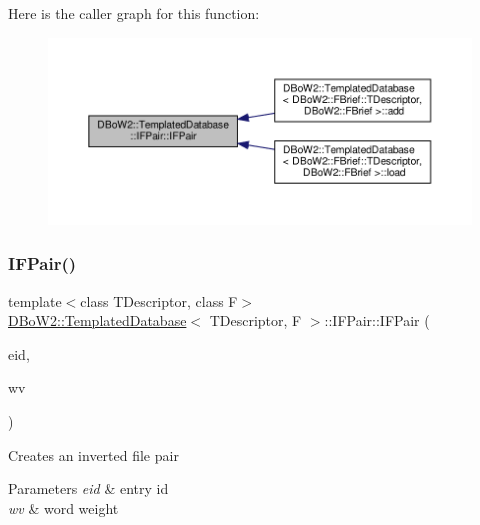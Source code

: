 Here is the caller graph for this function\+:\nopagebreak
\begin{figure}[H]
\begin{center}
\leavevmode
\includegraphics[width=350pt]{structDBoW2_1_1TemplatedDatabase_1_1IFPair_af01918e869de76b592637b0fb4c55401_icgraph}
\end{center}
\end{figure}
\mbox{\label{structDBoW2_1_1TemplatedDatabase_1_1IFPair_a4d449ba7e48cab711302bd5752d65b1e}} 
\subsubsection{\texorpdfstring{I\+F\+Pair()}{IFPair()}\hspace{0.1cm}{\footnotesize\ttfamily [2/2]}}
{\footnotesize\ttfamily template$<$class T\+Descriptor, class F$>$ \\
\hyperlink{classDBoW2_1_1TemplatedDatabase}{D\+Bo\+W2\+::\+Templated\+Database}$<$ T\+Descriptor, F $>$\+::I\+F\+Pair\+::\+I\+F\+Pair (\begin{DoxyParamCaption}\item[{\hyperlink{namespaceDBoW2_a060a36cf320e6e831ee98915c19c1623}{Entry\+Id}}]{eid,  }\item[{\hyperlink{namespaceDBoW2_a55fcd7333e591a38e96b91f41bc182f6}{Word\+Value}}]{wv }\end{DoxyParamCaption})\hspace{0.3cm}{\ttfamily [inline]}}

Creates an inverted file pair 
\begin{DoxyParams}{Parameters}
{\em eid} & entry id \\
\hline
{\em wv} & word weight \\
\hline
\end{DoxyParams}


